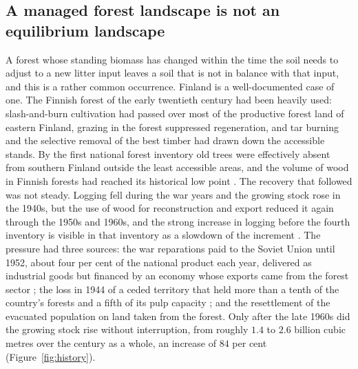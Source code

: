 \documentclass[11pt]{article}
\begin{document}
\subsection{A managed forest landscape is not an equilibrium landscape}
A forest whose standing biomass has changed within the time the soil needs to adjust to a
new litter input leaves a soil that is not in balance with that input, and this is a rather
common occurrence. Finland is a well-documented case
of one. The Finnish forest of the early twentieth century had been heavily used:
slash-and-burn cultivation had passed over most of the productive forest land of eastern
Finland, grazing in the forest suppressed regeneration, and tar burning and the selective
removal of the best timber had drawn down the accessible stands. By the first national
forest inventory old trees were effectively absent from southern Finland outside the least
accessible areas, and the volume of wood in Finnish forests had reached its historical low
point \citep{Aakala2023}. The recovery that followed was not steady. Logging fell during the
war years and the growing stock rose in the 1940s, but the use of wood for reconstruction and
export reduced it again through the 1950s and 1960s, and the strong increase in logging before
the fourth inventory is visible in that inventory as a slowdown of the increment
\citep{Korhonen2021}. The pressure had three sources: the war reparations paid to the Soviet
Union until 1952, about four per cent of the national product each year, delivered as
industrial goods but financed by an economy whose exports came from the forest sector
\citep{Mitrunen2024}; the loss in 1944 of a ceded territory that held more than a tenth of the
country's forests and a fifth of its pulp capacity \citep{Kochetkova2020}; and the resettlement
of the evacuated population on land taken from the forest. Only after the late 1960s did the
growing stock rise without interruption, from roughly $1.4$ to $2.6$ billion cubic metres over
the century as a whole, an increase of $84$ per cent \citep{Korhonen2024}
(Figure~\ref{fig:history}).
\end{document}
